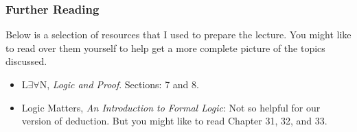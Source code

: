 \documentclass{beamer}
\theoremstyle{indentDefn} \newtheorem{defn}[]{Definition}
\begin{document}
\begin{frame}
  \frametitle{Further Reading}


Below is a selection of resources that I used to prepare the lecture. You might like to read over them yourself to help get a more complete picture of the topics discussed. 

\vspace{0.5cm}

\begin{itemize}
	\item L$\exists \forall$N, \emph{Logic and Proof}. Sections:  7 and 8.
	\item Logic Matters, \emph{An Introduction to Formal Logic}: Not so helpful for our version of deduction. But you might like to read Chapter 31, 32, and 33. 
\end{itemize}


\end{frame}
\end{document}
